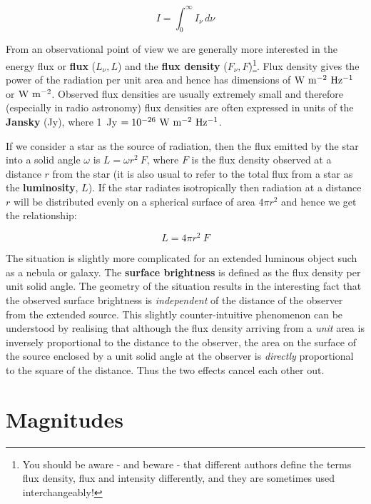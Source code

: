 \documentclass[twoside,11pt]{article}
\newcommand{\xlabel}[1]{}
\begin{document}
\begin{equation}
I= \int_{0}^{\infty}I_\nu\,d\nu
\end{equation}

From an observational point of view we are generally more interested in
the energy flux or {\bf flux} ($L_\nu, L$) and the {\bf flux density}
($F_\nu, F$)\footnote{You should be aware - and beware - that different
authors define the terms flux density, flux and intensity differently,
and they are sometimes used interchangeably!}. Flux density gives the
power of the radiation per unit area and hence has dimensions of ${\rm
W~m^{-2}~Hz^{-1}}$ or ${\rm W~m^{-2}}$. Observed flux densities are
usually extremely small and therefore (especially in radio astronomy)
flux densities are often expressed in units of the {\bf Jansky}
(Jy), where 1~Jy $= 10^{-26}~{\rm W~m^{-2}~Hz^{-1}}$.

If we consider a star as the source of radiation, then the flux
emitted by the star into a solid angle $\omega$ is $L=\omega r^2~F$,
where $F$ is the flux density observed at a distance $r$ from the
star (it is also usual to refer to the total flux from a star as the {\bf
luminosity}, $L$). If the star radiates isotropically then
radiation at a distance $r$ will be distributed evenly on a spherical
surface of area $4\pi r^2$ and hence we get the relationship:

\begin{equation}
L = 4 \pi r^2~F
\end{equation}

The situation is slightly more complicated for an extended luminous
object such as a nebula or galaxy. The {\bf surface brightness} is
defined as the flux density per unit solid angle. The geometry of the
situation results in the interesting fact that the observed surface
brightness is {\it independent} of the distance of the observer from
the extended source. This slightly counter-intuitive phenomenon can be
understood by realising that although the flux density arriving from a
{\it unit} area is inversely proportional to the distance to the observer,
the area on the surface of the source enclosed by a unit solid angle at
the observer is {\it directly} proportional to the square of the
distance. Thus the two effects cancel each other out.


\section{\xlabel{MAGNITUDES}\label{MAGNITUDES}Magnitudes}
\end{document}
